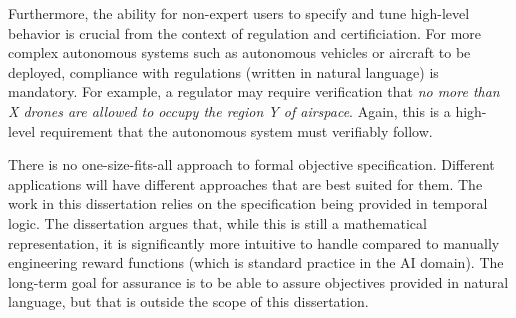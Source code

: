 Furthermore, the ability for non-expert users to specify and tune high-level behavior is crucial from the context of regulation and certificiation. For more complex autonomous systems such as autonomous vehicles or aircraft to be deployed, compliance with regulations (written in natural language) is mandatory. For example, a regulator may require verification that \emph{no more than X drones are allowed to occupy the region Y of airspace}. Again, this is a high-level requirement that the autonomous system must verifiably follow. 

There is no one-size-fits-all approach to formal objective specification. Different applications will have different approaches that are best suited for them. The work in this dissertation relies on the specification being provided in temporal logic. The dissertation argues that, while this is still a mathematical representation, it is significantly more intuitive to handle compared to manually engineering reward functions (which is standard practice in the AI domain). The long-term goal for assurance is to be able to assure objectives provided in natural language, but that is outside the scope of this dissertation. 










